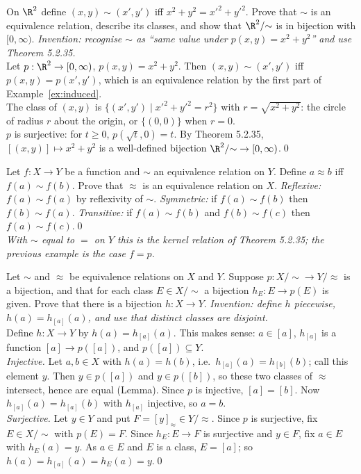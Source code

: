\begin{bexample}
On $\R^2$ define $(x,y)\sim(x',y')$ iff $x^2+y^2=x'^2+y'^2$. Prove that $\sim$ is an equivalence relation, describe its classes, and show that $\R^2/{\sim}$ is in bijection with $[0,\infty)$.
\solution
\emph{Invention: recognise $\sim$ as ``same value under $p(x,y)=x^2+y^2$'' and use Theorem 5.2.35.}\\
Let $p:\R^2\to[0,\infty)$, $p(x,y)=x^2+y^2$. Then $(x,y)\sim(x',y')$ iff $p(x,y)=p(x',y')$, which is an equivalence relation by the first part of Example~\ref{ex:induced}.\\
The class of $(x,y)$ is $\{(x',y')\mid x'^2+y'^2=r^2\}$ with $r=\sqrt{x^2+y^2}$: the circle of radius $r$ about the origin, or $\{(0,0)\}$ when $r=0$.\\
$p$ is surjective: for $t\ge0$, $p(\sqrt t,0)=t$. By Theorem 5.2.35, $[(x,y)]\mapsto x^2+y^2$ is a well-defined bijection $\R^2/{\sim}\to[0,\infty)$.\qed
\end{bexample}

\begin{bexample}
Let $f:X\to Y$ be a function and $\sim$ an equivalence relation on $Y$. Define $a\approx b$ iff $f(a)\sim f(b)$. Prove that $\approx$ is an equivalence relation on $X$.
\solution
\emph{Reflexive:} $f(a)\sim f(a)$ by reflexivity of $\sim$. \emph{Symmetric:} if $f(a)\sim f(b)$ then $f(b)\sim f(a)$. \emph{Transitive:} if $f(a)\sim f(b)$ and $f(b)\sim f(c)$ then $f(a)\sim f(c)$.\qed\\
\emph{With $\sim$ equal to $=$ on $Y$ this is the kernel relation of Theorem 5.2.35; the previous example is the case $f=p$.}
\end{bexample}

\begin{bexample}
Let $\sim$ and $\approx$ be equivalence relations on $X$ and $Y$. Suppose $p:X/{\sim}\to Y/{\approx}$ is a bijection, and that for each class $E\in X/{\sim}$ a bijection $h_E:E\to p(E)$ is given. Prove that there is a bijection $h:X\to Y$.
\solution
\emph{Invention: define $h$ piecewise, $h(a)=h_{[a]}(a)$, and use that distinct classes are disjoint.}\\
Define $h:X\to Y$ by $h(a)=h_{[a]}(a)$. This makes sense: $a\in[a]$, $h_{[a]}$ is a function $[a]\to p([a])$, and $p([a])\subseteq Y$.\\
\emph{Injective.} Let $a,b\in X$ with $h(a)=h(b)$, i.e.\ $h_{[a]}(a)=h_{[b]}(b)$; call this element $y$. Then $y\in p([a])$ and $y\in p([b])$, so these two classes of $\approx$ intersect, hence are equal (Lemma). Since $p$ is injective, $[a]=[b]$. Now $h_{[a]}(a)=h_{[a]}(b)$ with $h_{[a]}$ injective, so $a=b$.\\
\emph{Surjective.} Let $y\in Y$ and put $F=[y]_\approx\in Y/{\approx}$. Since $p$ is surjective, fix $E\in X/{\sim}$ with $p(E)=F$. Since $h_E:E\to F$ is surjective and $y\in F$, fix $a\in E$ with $h_E(a)=y$. As $a\in E$ and $E$ is a class, $E=[a]$; so $h(a)=h_{[a]}(a)=h_E(a)=y$.\qed
\end{bexample}

